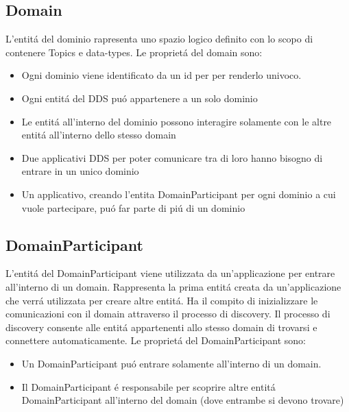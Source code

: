 

    


\subsection{Domain}
L'entitá del dominio rapresenta uno spazio logico definito con
lo scopo di contenere Topics e data-types. 
Le proprietá del domain sono:
\begin{itemize}
    \item Ogni dominio viene identificato da un id per 
    per renderlo univoco.
    \item Ogni entitá del DDS puó appartenere
    a un solo dominio
    \item Le entitá all'interno del dominio possono interagire
    solamente con le altre entitá all'interno dello stesso domain
    \item Due applicativi DDS per poter comunicare tra di loro
    hanno bisogno di entrare in un unico dominio
    \item Un applicativo, creando l'entita DomainParticipant per ogni
    dominio a cui vuole partecipare, puó far parte di piú di un 
    dominio
\end{itemize}\cite{domainrti}


\subsection{DomainParticipant}
L'entitá del DomainParticipant viene utilizzata da un'applicazione
per entrare all'interno di un domain. 
Rappresenta la prima entitá creata da un'applicazione che verrá 
utilizzata per creare altre entitá. Ha il compito di inizializzare
le comunicazioni con il domain attraverso il processo di discovery.
Il processo di discovery consente alle entitá appartenenti allo 
stesso domain di trovarsi e connettere automaticamente.
Le proprietá del DomainParticipant sono:
\begin{itemize}
    \item Un DomainParticipant puó entrare solamente all'interno
    di un domain.
    \item Il DomainParticipant é responsabile per scoprire altre
    entitá DomainParticipant all'interno del domain (dove entrambe
    si devono trovare)
\end{itemize}\cite{domainparticipantrti}




